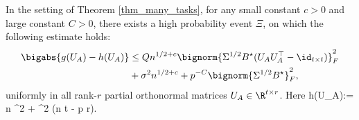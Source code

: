 \documentclass[aos,preprint]{imsart}
\begin{document}
	\begin{lemma}\label{lem_exp_opt}
		In the setting of Theorem \ref{thm_many_tasks}, for any small constant $c>0$ and large constant $C>0$, there exists a high probability event $\Xi$, on which the following estimate holds:
		  \begin{align}
		\bigabs{g(U_A) - h(U_A)} &\le  Q n^{1/2+c} \bignorm{\Sigma^{1/2} B^{\star} (U_AU_A^{\top} - \id_{t\times t})}_F^2 \nonumber\\
		& +  \sigma^2 n^{ 1/2+c} + p^{-C} \bignorm{\Sigma^{1/2} B^{\star}}_F^2,\label{eq_gA_err}
	\end{align}
	uniformly in all rank-$r$ partial orthonormal matrices $U_A\in \R^{t\times r}$. Here %
	\be\label{same_hA}h(U_A):= n ^2 + \sigma^2 (n t - p r).\ee		
	\end{lemma}
\end{document}
